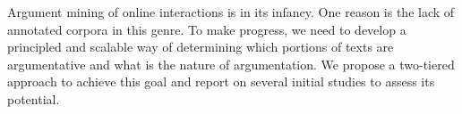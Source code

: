 Argument mining of online interactions is in its infancy. One reason is the lack of annotated corpora in this genre. To make progress, we need to develop a principled and scalable way of determining which portions of texts are argumentative and what is the nature of argumentation. We propose a two-tiered approach to achieve this goal and report on several initial studies to assess its potential.
